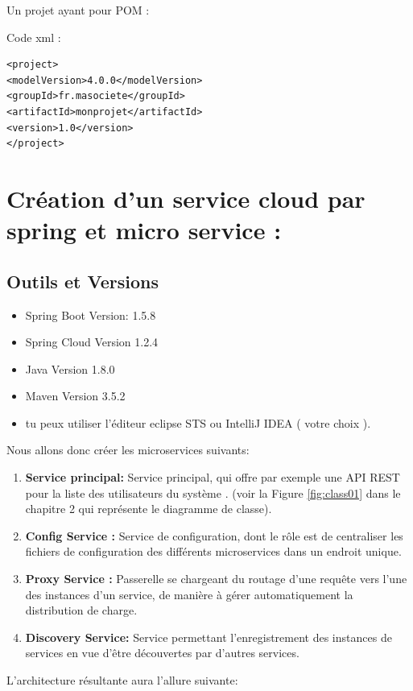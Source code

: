     Un projet ayant pour POM :
    
    Code xml : 
 
     
    \lstset{language=XML}
\begin{lstlisting}
<project>
<modelVersion>4.0.0</modelVersion>
<groupId>fr.masociete</groupId>
<artifactId>monprojet</artifactId>
<version>1.0</version>
</project>
\end{lstlisting}
    











\section{Création d'un service cloud par spring et micro service :}

\subsection{Outils et Versions}

\begin{itemize}
\item Spring Boot Version: 1.5.8
\item Spring Cloud Version 1.2.4
\item Java Version 1.8.0 
\item Maven Version 3.5.2
\item  tu peux utiliser l'éditeur eclipse STS ou IntelliJ IDEA ( votre choix ).
\end{itemize}



Nous allons donc créer les microservices suivants:
\begin{enumerate}
	
\item 	\textbf{Service principal:} Service principal, qui offre par exemple une API REST pour  la liste des utilisateurs du système  . (voir la Figure \ref{fig:class01} dans le chapitre 2 qui représente le diagramme de classe).
	
\item 	\textbf{Config Service :} Service de configuration, dont le rôle est de centraliser les fichiers de configuration des différents microservices dans un endroit unique.
	
\item 		\textbf{Proxy Service :} Passerelle se chargeant du routage d'une requête vers l'une des instances d'un service, de manière à gérer automatiquement la distribution de charge.
	
\item 		\textbf{Discovery Service:} Service permettant l'enregistrement des instances de services en vue d'être découvertes par d'autres services.
\end{enumerate}
L'architecture résultante aura l'allure suivante:


